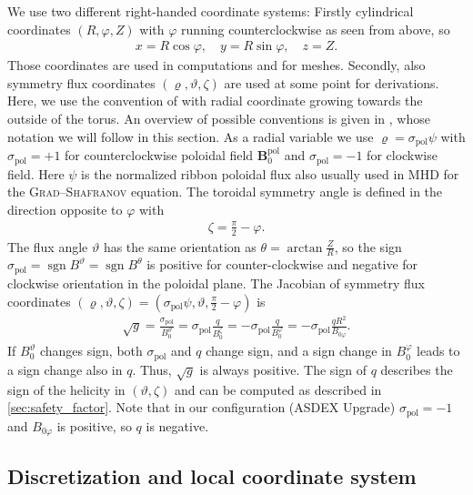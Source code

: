 \documentclass[a4paper, twoside, 10pt, english]{article}
\numberwithin{equation}{section}
\let\temp\varrho
\let\varrho\rho
\let\rho\temp
\let\temp\vartheta
\let\vartheta\theta
\let\theta\temp
\let\temp\varphi
\let\varphi\phi
\let\phi\temp
\let\vec\symbf
\DeclareMathOperator\sgn{sgn}
\newcommand*\pol{\ensuremath{\textrm{pol}}}  %
\begin{document}
We use two different right-handed coordinate systems: Firstly cylindrical coordinates $(R, \phi, Z)$ with $\phi$ running counterclockwise as seen from above, so
\begin{gather*}
  x = R \cos \phi, \quad y = R \sin \phi, \quad z = Z.
\end{gather*}
Those coordinates are used in computations and for meshes. Secondly, also symmetry flux coordinates $(\rho, \theta, \zeta)$ are used at some point for derivations. Here, we use the convention of \cite{dHaeseleer91} with radial coordinate growing towards the outside of the torus. An overview of possible conventions is given in \cite{Sauter13}, whose notation we will follow in this section. As a radial variable we use $\rho = \sigma_{\pol} \psi$ with $\sigma_{\pol} = +1$ for counterclockwise poloidal field $\vec{B}_{0}^{\pol}$ and $\sigma_{\pol} = -1$ for clockwise field. Here $\psi$ is the normalized ribbon poloidal flux also usually used in MHD for the \textsc{Grad}--\textsc{Shafranov} equation. The toroidal symmetry angle is defined in the direction opposite to $\phi$ with
\begin{gather*}
  \zeta = \frac{\pi}{2} - \phi.
\end{gather*}
The flux angle $\theta$ has the same orientation as $\vartheta = \arctan \frac{Z}{R}$, so the sign $\sigma_{\pol} = \sgn B^{\theta} = \sgn B^{\vartheta}$ is positive for counter-clockwise and negative for clockwise orientation in the poloidal plane. The Jacobian of symmetry flux coordinates $(\rho, \theta, \zeta) = (\sigma_{\pol} \psi, \theta, \frac{\pi}{2} - \phi)$ is
\begin{gather}
  \sqrt{g} = \frac{\sigma_{\pol}}{B_{0}^{\theta}} = \sigma_{\pol} \frac{q}{B_{0}^{\zeta}} = -\sigma_{\pol} \frac{q}{B_{0}^{\phi}} = -\sigma_{\pol} \frac{q R^{2}}{B_{0 \phi}}.
\end{gather}
If $B_{0}^{\theta}$ changes sign, both $\sigma_{\pol}$ and $q$ change sign, and a sign change in $B_{0}^{\phi}$ leads to a sign change also in $q$. Thus, $\sqrt{g}$ is always positive. The sign of $q$ describes the sign of the helicity in $(\theta, \zeta)$ and can be computed as described in \cref{sec:safety_factor}. Note that in our configuration (ASDEX Upgrade) $\sigma_{\pol} = -1$ and $B_{0 \phi}$ is positive, so $q$ is negative.

\subsection{Discretization and local coordinate system}
\label{sec:grid}
\end{document}

